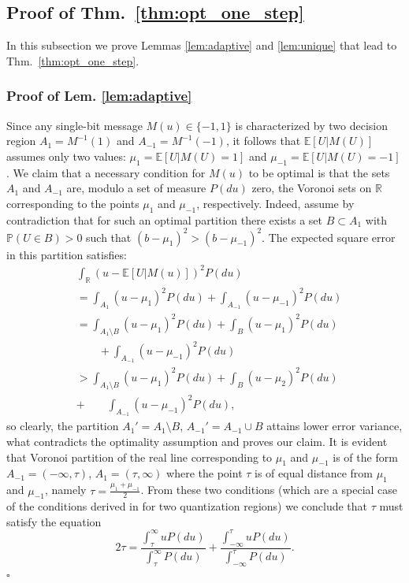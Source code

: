 \documentclass[letterpaper, conference]{IEEEtran}      %
\newcommand*{\QEDA}{\hfill\ensuremath{\square}}
\begin{document}
\subsection*{Proof of Thm.~\ref{thm:opt_one_step}}
In this subsection we prove Lemmas \ref{lem:adaptive} and \ref{lem:unique} that lead to Thm.~\ref{thm:opt_one_step}. 

\subsubsection*{Proof of Lem. \ref{lem:adaptive}}
Since any single-bit message $M(u) \in \{-1,1\}$ is characterized by two decision region $A_1 = M^{-1}(1)$ and $A_{-1} = M^{-1}(-1)$, it follows that $\mathbb E \left[ U | M(U) \right]$ assumes only two values: $\mu_1 = \mathbb E \left[ U | M(U) = 1 \right]$ and $\mu_{-1} = \mathbb E \left[ U | M(U) = -1 \right]$. We claim that a necessary condition for $M(u)$ to be optimal is that the sets $A_1$ and $A_{-1}$ are, modulo a set of measure $P(du)$ zero, the Voronoi sets on $\mathbb R$ corresponding to the points $\mu_1$ and $\mu_{-1}$, respectively. Indeed, assume by contradiction that for such an optimal partition there exists a set $B \subset A_{1}$ with $\mathbb P (U \in B) >0$ such that $\left( b-\mu_{1} \right)^2 > \left( b- \mu_{-1} \right)^2$. The expected square error in this partition satisfies:
\begin{align*}
& \int_{\mathbb R} \left( u - \mathbb E[U|M(u)]  \right)^2 P(du) \\
& = \int_{A_1} (u- \mu_1)^2 P(du) + \int_{A_{-1}} (u- \mu_{-1})^2 P(du) \\
& = \int_{A_1\setminus B} (u- \mu_1)^2 P(du) +  \int_{B} (u- \mu_1)^2 P(du) \\
&\quad \quad + \int_{A_{-1}} (u- \mu_{-1})^2 P(du) \\
& > \int_{A_1\setminus B} (u- \mu_1)^2 P(du) +  \int_{B} (u- \mu_2)^2 P(du) \\
& + \quad \quad  \int_{A_{-1}} (u- \mu_{-1})^2 P(du),
\end{align*}
so clearly, the partition $A_1' = A_1 \setminus B$, $A_{-1}' = A_{-1} \cup B$ attains lower error variance, what contradicts the optimality assumption and proves our claim. It is evident that Voronoi partition of the real line corresponding to $\mu_1$ and $\mu_{-1}$ is of the form $A_{-1} = (-\infty,\tau)$, $A_{1} = (\tau, \infty)$ where the point $\tau$ is of equal distance from $\mu_1$ and $\mu_{-1}$, namely $\tau = \frac{\mu_1 + \mu_{-1}}{2}$. From these two conditions (which are a special case of the conditions derived in \cite{1056489} for two quantization regions) we conclude that $\tau$ must satisfy the equation
\[
2 \tau = \frac{\int_{\tau}^\infty u P(du)}{\int_{\tau}^\infty P(du)} + \frac{\int_{-\infty}^{\tau} u P(du)}{\int_{-\infty}^{\tau} P(du)}.
\] 
\QEDA
\end{document}
